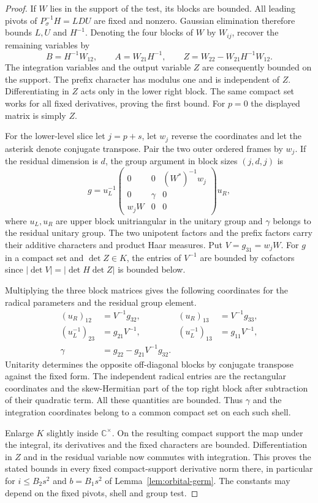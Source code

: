 \begin{proof}
If \(W\) lies in the support of the test, its blocks are bounded. All leading pivots of \(P_\sigma^{-1}H=LDU\) are fixed and nonzero. Gaussian elimination therefore bounds \(L,U\) and \(H^{-1}\). Denoting the four blocks of \(W\) by \(W_{ij}\), recover the remaining variables by
\[
 B=H^{-1}W_{12},\qquad A=W_{21}H^{-1},\qquad
 Z=W_{22}-W_{21}H^{-1}W_{12}.
\]
The integration variables and the output variable \(Z\) are consequently bounded on the support. The prefix character has modulus one and is independent of \(Z\). Differentiating in \(Z\) acts only in the lower right block. The same compact set works for all fixed derivatives, proving the first bound. For \(p=0\) the displayed matrix is simply \(Z\).

For the lower-level slice let \(j=p+s\), let \(w_j\) reverse the coordinates and let the asterisk denote conjugate transpose. Pair the two outer ordered frames by \(w_j\). If the residual dimension is \(d\), the group argument in block sizes \((j,d,j)\) is
\[
 g=u_L^{-1}
 \begin{pmatrix}0&0&(W^*)^{-1}w_j\\0&\gamma&0\\w_jW&0&0\end{pmatrix}
 u_R ,
\]
where \(u_L,u_R\) are upper block unitriangular in the unitary group and \(\gamma\) belongs to the residual unitary group. The two unipotent factors and the prefix factors carry their additive characters and product Haar measures. Put \(V=g_{31}=w_jW\). For \(g\) in a compact set and \(\det Z\in K\), the entries of \(V^{-1}\) are bounded by cofactors since \(|\det V|=|\det H\det Z|\) is bounded below.

Multiplying the three block matrices gives the following coordinates for the radical parameters and the residual group element.
\[
\begin{aligned}
 (u_R)_{12}&=V^{-1}g_{32},& (u_R)_{13}&=V^{-1}g_{33},\\
 (u_L^{-1})_{23}&=g_{21}V^{-1},&
 (u_L^{-1})_{13}&=g_{11}V^{-1},\\
 \gamma&=g_{22}-g_{21}V^{-1}g_{32}.
\end{aligned}
\]
Unitarity determines the opposite off-diagonal blocks by conjugate transpose against the fixed form. The independent radical entries are the rectangular coordinates and the skew-Hermitian part of the top right block after subtraction of their quadratic term. All these quantities are bounded. Thus \(\gamma\) and the integration coordinates belong to a common compact set on each such shell.

Enlarge \(K\) slightly inside \(\mathbb C^\times\). On the resulting compact support the map under the integral, its derivatives and the fixed characters are bounded. Differentiation in \(Z\) and in the residual variable now commutes with integration. This proves the stated bounds in every fixed compact-support derivative norm there, in particular for \(i\le B_2s^2\) and \(b=B_1s^2\) of Lemma~\ref{lem:orbital-germ}. The constants may depend on the fixed pivots, shell and group test.
\end{proof}

